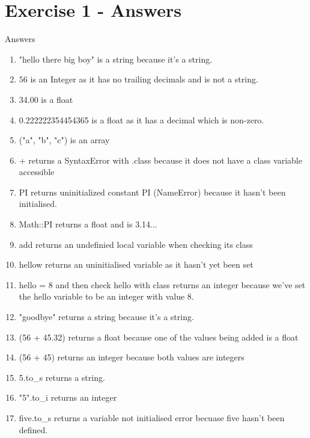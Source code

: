 \documentclass{scrreprt}
\begin{document}
	\section{Exercise 1 - Answers}\label{E1A}
	Answers
	\begin{enumerate}
		\item "hello there big boy" is a string because it's a string.
		\item $56$ is an Integer as it has no trailing decimals and is not a string.
		\item 34.00  is a float
		\item 0.222222354454365 is a float as it has a decimal which is non-zero. 
		\item ("a", "b", "c") is an array
		\item + returns a SyntaxError with .class because it does not have a class variable accessible
		\item PI  returns uninitialized constant PI (NameError) because it hasn't been initialised.
		\item Math::PI returns a float and is 3.14...
		\item add returns an undefinied local variable when checking its class
		\item hellow returns an uninitialised variable as it hasn't yet been set
		\item hello = 8 and then check hello with class returns an integer because we've set the hello variable to be an integer with value 8.
		\item "goodbye" returns a string because it's a string.
		\item (56 + 45.32) returns a float because one of the values being added is a float
		\item (56 + 45) returns an integer because both values are integers
		\item 5.to\_s returns a string.
		\item "5".to\_i  returns an integer
		\item five.to\_s returns a variable not initialised error becuase five hasn't been defined.
	\end{enumerate}
	
\end{document}
